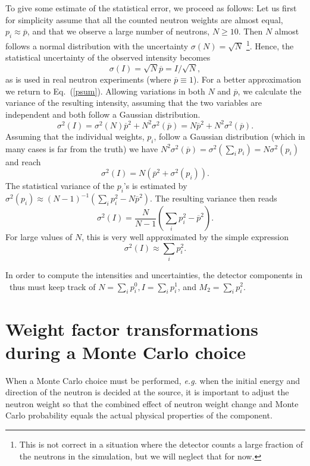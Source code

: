 To give some estimate of the statistical error, we proceed as follows:
Let us first for simplicity assume that all the counted neutron weights are
almost equal, $p_i \approx \overline{p}$, 
and that we observe a large number of neutrons, $N \geq 10$.
Then $N$ almost follows a normal distribution
with the uncertainty $\sigma(N) = \sqrt{N}$ 
\footnote{This is not correct in a
situation where the detector counts a large fraction of the
neutrons in the simulation, but we will neglect that for now.}.
Hence, the statistical uncertainty of the observed intensity becomes
\begin{equation}
 \sigma(I) = \sqrt{N} \overline{p} = I / \sqrt{N} ,
\end{equation}
as is used in real neutron experiments (where $\overline{p} \equiv 1$).
For a better approximation we return to Eq.~(\ref{psum}).
Allowing variations in both $N$ and $\overline{p}$,
we calculate the variance of the resulting intensity,
assuming that the two variables are independent and both follow
a Gaussian distribution.
\begin{equation}
\sigma^2(I) = \sigma^2(N) \overline{p}^2 + N^2 \sigma^2(\overline{p})
            = N \overline{p}^2 + N^2 \sigma^2(\overline{p}) .
\end{equation}
Assuming that the individual weights, $p_i$, follow a Gaussian distribution
(which in many cases is far from the truth)
we have $N^2 \sigma^2(\overline{p}) = \sigma^2(\sum_i p_i) = N
\sigma^2(p_i)$
and reach
\begin{equation}
\sigma^2(I) = N \left( \overline{p}^2 + \sigma^2(p_i) \right).
\end{equation}
The statistical variance of the $p_i$'s is estimated by
$\sigma^2(p_i) \approx (N-1)^{-1} (\sum_i p_i^2 - N \overline{p}^2)$.
The resulting variance then reads
\begin{equation}
\sigma^2(I) = \frac{N}{N-1} \left( \sum_i p_i^2 - \overline{p}^2  \right) .
\end{equation}
For large values of $N$, this is very well approximated 
by the simple expression 
\begin{equation}
\sigma^2(I) \approx \sum_i p_i^2 .
\end{equation}

In order to compute the intensities and uncertainties, the detector components 
in \MCS\ thus must keep track of
$N=\sum_i p_i^0, I=\sum_i p_i^1$, and $M_2 = \sum_i p_i^2$.

\section{Weight factor transformations during a Monte Carlo
 choice}
When a Monte Carlo choice must be performed, {\em e.g.} when the
initial energy and direction of the neutron is decided at the source,
it is important to adjust the neutron weight so that the combined
effect of neutron weight change and Monte Carlo probability
equals the actual physical properties of the component.


